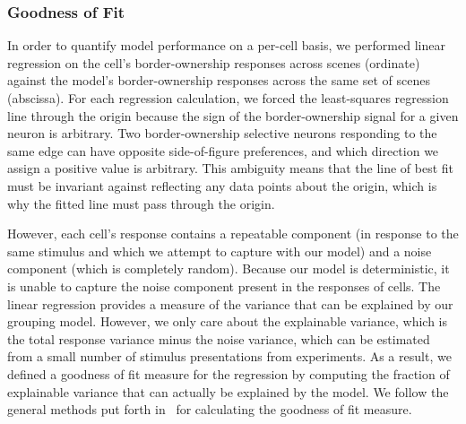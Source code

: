 \subsubsection{Goodness of Fit}
In order to quantify model performance on a per-cell basis, we performed linear regression on the cell's border-ownership responses across scenes (ordinate) against the model's border-ownership responses across the same set of scenes (abscissa). For each regression calculation, we forced the least-squares regression line through the origin because the sign of the border-ownership signal for a given neuron is arbitrary. Two border-ownership selective neurons responding to the same edge can have opposite side-of-figure preferences, and which direction we assign a positive value is arbitrary. This ambiguity means that the line of best fit must be invariant against reflecting any data points about the origin, which is why the fitted line must pass through the origin.

However, each cell's response contains a repeatable component (in response to the same stimulus and which we attempt to capture with our model) and a noise component (which is completely random). Because our model is deterministic, it is unable to capture the noise component present in the responses of cells. The linear regression provides a measure of the variance that can be explained by our grouping model. However, we only care about the explainable variance, which is the total response variance minus the noise variance, which can be estimated from a small number of stimulus presentations from experiments. As a result, we defined a goodness of fit measure for the regression by computing the fraction of explainable variance that can actually be explained by the model. We follow the general methods put forth in~\citet{DiCarlo_etal98} for calculating the goodness of fit measure.

